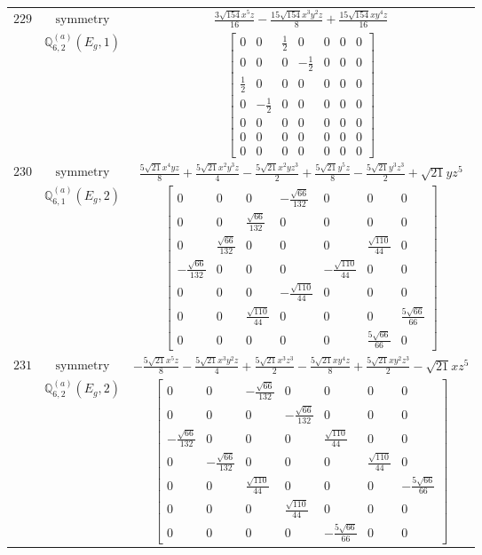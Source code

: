 \documentclass[fleqn,8pt,landscape]{jsarticle}
\begin{document}
\begin{longtable}{ccc}
$ 229 $ & $ \text{symmetry} $ & $ \frac{3 \sqrt{154} x^{5} z}{16} - \frac{15 \sqrt{154} x^{3} y^{2} z}{8} + \frac{15 \sqrt{154} x y^{4} z}{16} $ \\
$  $ & $ \mathbb{Q}_{6,2}^{(a)}(E_{g},1) $ & $ \begin{bmatrix} 0 & 0 & \frac{1}{2} & 0 & 0 & 0 & 0 \\ 0 & 0 & 0 & - \frac{1}{2} & 0 & 0 & 0 \\ \frac{1}{2} & 0 & 0 & 0 & 0 & 0 & 0 \\ 0 & - \frac{1}{2} & 0 & 0 & 0 & 0 & 0 \\ 0 & 0 & 0 & 0 & 0 & 0 & 0 \\ 0 & 0 & 0 & 0 & 0 & 0 & 0 \\ 0 & 0 & 0 & 0 & 0 & 0 & 0 \end{bmatrix} $ \\ \hline
$ 230 $ & $ \text{symmetry} $ & $ \frac{5 \sqrt{21} x^{4} y z}{8} + \frac{5 \sqrt{21} x^{2} y^{3} z}{4} - \frac{5 \sqrt{21} x^{2} y z^{3}}{2} + \frac{5 \sqrt{21} y^{5} z}{8} - \frac{5 \sqrt{21} y^{3} z^{3}}{2} + \sqrt{21} y z^{5} $ \\
$  $ & $ \mathbb{Q}_{6,1}^{(a)}(E_{g},2) $ & $ \begin{bmatrix} 0 & 0 & 0 & - \frac{\sqrt{66}}{132} & 0 & 0 & 0 \\ 0 & 0 & \frac{\sqrt{66}}{132} & 0 & 0 & 0 & 0 \\ 0 & \frac{\sqrt{66}}{132} & 0 & 0 & 0 & \frac{\sqrt{110}}{44} & 0 \\ - \frac{\sqrt{66}}{132} & 0 & 0 & 0 & - \frac{\sqrt{110}}{44} & 0 & 0 \\ 0 & 0 & 0 & - \frac{\sqrt{110}}{44} & 0 & 0 & 0 \\ 0 & 0 & \frac{\sqrt{110}}{44} & 0 & 0 & 0 & \frac{5 \sqrt{66}}{66} \\ 0 & 0 & 0 & 0 & 0 & \frac{5 \sqrt{66}}{66} & 0 \end{bmatrix} $ \\ \hline
$ 231 $ & $ \text{symmetry} $ & $ - \frac{5 \sqrt{21} x^{5} z}{8} - \frac{5 \sqrt{21} x^{3} y^{2} z}{4} + \frac{5 \sqrt{21} x^{3} z^{3}}{2} - \frac{5 \sqrt{21} x y^{4} z}{8} + \frac{5 \sqrt{21} x y^{2} z^{3}}{2} - \sqrt{21} x z^{5} $ \\
$  $ & $ \mathbb{Q}_{6,2}^{(a)}(E_{g},2) $ & $ \begin{bmatrix} 0 & 0 & - \frac{\sqrt{66}}{132} & 0 & 0 & 0 & 0 \\ 0 & 0 & 0 & - \frac{\sqrt{66}}{132} & 0 & 0 & 0 \\ - \frac{\sqrt{66}}{132} & 0 & 0 & 0 & \frac{\sqrt{110}}{44} & 0 & 0 \\ 0 & - \frac{\sqrt{66}}{132} & 0 & 0 & 0 & \frac{\sqrt{110}}{44} & 0 \\ 0 & 0 & \frac{\sqrt{110}}{44} & 0 & 0 & 0 & - \frac{5 \sqrt{66}}{66} \\ 0 & 0 & 0 & \frac{\sqrt{110}}{44} & 0 & 0 & 0 \\ 0 & 0 & 0 & 0 & - \frac{5 \sqrt{66}}{66} & 0 & 0 \end{bmatrix} $ \\ \hline

\end{longtable}
\end{document}
